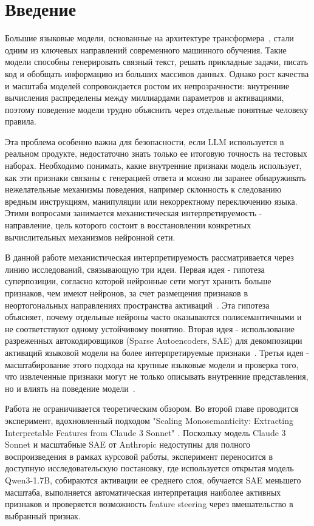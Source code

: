 \documentclass[a4paper,14pt]{extreport}
\begin{document}
\chapter*{Введение}
\pagestyle{plain}

Большие языковые модели, основанные на архитектуре трансформера~\cite{vaswani2017attention},
стали одним из ключевых направлений современного машинного обучения. Такие модели
способны генерировать связный текст, решать прикладные задачи, писать код и
обобщать информацию из больших массивов данных. Однако рост качества и масштаба
моделей сопровождается ростом их непрозрачности: внутренние вычисления распределены
между миллиардами параметров и активациями, поэтому поведение модели
трудно объяснить через отдельные понятные человеку правила.

Эта проблема особенно важна для безопасности, если LLM используется
в реальном продукте, недостаточно знать только ее итоговую точность на тестовых
наборах. Необходимо понимать, какие внутренние признаки модель использует, как
эти признаки связаны с генерацией ответа и можно ли заранее обнаруживать
нежелательные механизмы поведения, например склонность к следованию вредным
инструкциям, манипуляции или некорректному переключению языка. Этими вопросами
занимается механистическая интерпретируемость - направление, цель которого
состоит в восстановлении конкретных вычислительных механизмов нейронной сети.

В данной работе механистическая интерпретируемость рассматривается через линию
исследований, связывающую три идеи. Первая идея - гипотеза суперпозиции,
согласно которой нейронные сети могут хранить больше признаков, чем имеют
нейронов, за счет размещения признаков в неортогональных направлениях пространства
активаций~\cite{elhage2022superposition}. Эта гипотеза объясняет, почему отдельные
нейроны часто оказываются полисемантичными и не соответствуют одному устойчивому
понятию. Вторая идея - использование разреженных автокодировщиков (Sparse
Autoencoders, SAE) для декомпозиции активаций языковой модели на более
интерпретируемые признаки~\cite{bricken2023monosemanticity}. Третья идея -
масштабирование этого подхода на крупные языковые модели и проверка того, что
извлеченные признаки могут не только описывать внутренние представления, но и
влиять на поведение модели~\cite{templeton2024scaling}.

Работа не ограничивается теоретическим обзором. Во второй главе проводится
эксперимент, вдохновленный подходом "Scaling Monosemanticity: Extracting Interpretable Features from Claude 3 Sonnet" 
\cite{templeton2024scaling}.
Поскольку модель Claude 3 Sonnet и масштабные SAE от Anthropic недоступны для
полного воспроизведения в рамках курсовой работы, эксперимент переносится в
доступную исследовательскую постановку, где используется открытая модель Qwen3-1.7B,
собираются активации ее среднего слоя, обучается SAE меньшего масштаба,
выполняется автоматическая интерпретация наиболее активных признаков и проверяется
возможность feature steering через вмешательство в выбранный признак.
\end{document}
